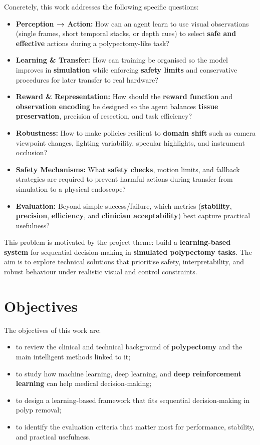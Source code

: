 Concretely, this work addresses the following specific questions:
\begin{itemize}
\item \textbf{Perception → Action:} How can an agent learn to use visual observations
	(single frames, short temporal stacks, or depth cues) to select \textbf{safe and effective}
	actions during a polypectomy-like task?
\item \textbf{Learning & Transfer:} How can training be organised so the model improves
	in \textbf{simulation} while enforcing \textbf{safety limits} and conservative procedures
	for later transfer to real hardware?
\item \textbf{Reward & Representation:} How should the \textbf{reward function} and
	\textbf{observation encoding} be designed so the agent balances \textbf{tissue preservation},
	precision of resection, and task efficiency?
\item \textbf{Robustness:} How to make policies resilient to \textbf{domain shift} such as
	camera viewpoint changes, lighting variability, specular highlights, and instrument occlusion?
\item \textbf{Safety Mechanisms:} What \textbf{safety checks}, motion limits, and fallback
	strategies are required to prevent harmful actions during transfer from simulation to
	a physical endoscope?
\item \textbf{Evaluation:} Beyond simple success/failure, which metrics (\textbf{stability},
	\textbf{precision}, \textbf{efficiency}, and \textbf{clinician acceptability}) best capture
	practical usefulness?
\end{itemize}

This problem is motivated by the project theme: build a \textbf{learning-based system}
for sequential decision-making in \textbf{simulated polypectomy tasks}. The aim is to
explore technical solutions that prioritise safety, interpretability, and robust
behaviour under realistic visual and control constraints.

\section*{Objectives}
The objectives of this work are:
\begin{itemize}
\item to review the clinical and technical background of \textbf{polypectomy} and the main
intelligent methods linked to it;
\item to study how machine learning, deep learning, and \textbf{deep reinforcement learning}
can help medical decision-making;
\item to design a learning-based framework that fits sequential decision-making in
polyp removal;
\item to identify the evaluation criteria that matter most for performance, stability,
and practical usefulness.
\end{itemize}

